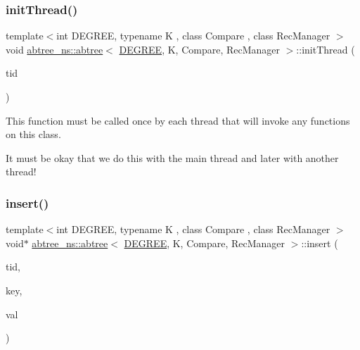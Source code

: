 \subsubsection{\texorpdfstring{init\+Thread()}{initThread()}\hspace{0.1cm}{\footnotesize\ttfamily [2/2]}}
{\footnotesize\ttfamily template$<$int D\+E\+G\+R\+EE, typename K , class Compare , class Rec\+Manager $>$ \\
void \hyperlink{classabtree__ns_1_1abtree}{abtree\+\_\+ns\+::abtree}$<$ \hyperlink{brown__sigouin__abtree__kcas_2adapter_8h_a5d88b17d70c985f2f2b8e987037fd6dd}{D\+E\+G\+R\+EE}, K, Compare, Rec\+Manager $>$\+::init\+Thread (\begin{DoxyParamCaption}\item[{const int}]{tid }\end{DoxyParamCaption})\hspace{0.3cm}{\ttfamily [inline]}}

This function must be called once by each thread that will invoke any functions on this class.

It must be okay that we do this with the main thread and later with another thread! \mbox{\label{classabtree__ns_1_1abtree_a951a74f5690dbbaf55ab121fa3b5c6ca}} 
\subsubsection{\texorpdfstring{insert()}{insert()}\hspace{0.1cm}{\footnotesize\ttfamily [1/2]}}
{\footnotesize\ttfamily template$<$int D\+E\+G\+R\+EE, typename K , class Compare , class Rec\+Manager $>$ \\
void$\ast$ \hyperlink{classabtree__ns_1_1abtree}{abtree\+\_\+ns\+::abtree}$<$ \hyperlink{brown__sigouin__abtree__kcas_2adapter_8h_a5d88b17d70c985f2f2b8e987037fd6dd}{D\+E\+G\+R\+EE}, K, Compare, Rec\+Manager $>$\+::insert (\begin{DoxyParamCaption}\item[{const int}]{tid,  }\item[{const K \&}]{key,  }\item[{void $\ast$const}]{val }\end{DoxyParamCaption})\hspace{0.3cm}{\ttfamily [inline]}}

